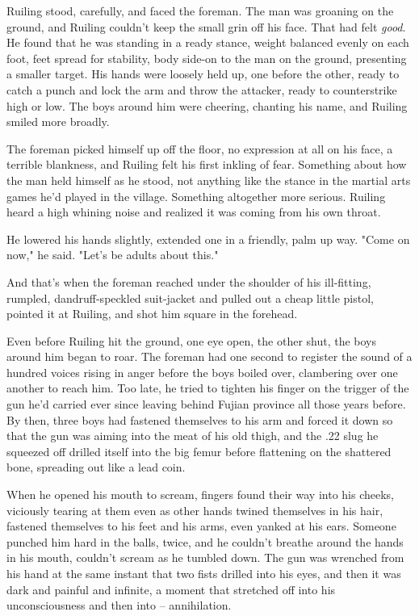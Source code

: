 Ruiling stood, carefully, and faced the foreman. The man was
groaning on the ground, and Ruiling couldn't keep the small grin
off his face. That had felt \emph{good}. He found that he was
standing in a ready stance, weight balanced evenly on each foot,
feet spread for stability, body side-on to the man on the ground,
presenting a smaller target. His hands were loosely held up, one
before the other, ready to catch a punch and lock the arm and throw
the attacker, ready to counterstrike high or low. The boys around
him were cheering, chanting his name, and Ruiling smiled more
broadly.

The foreman picked himself up off the floor, no expression at all
on his face, a terrible blankness, and Ruiling felt his first
inkling of fear. Something about how the man held himself as he
stood, not anything like the stance in the martial arts games he'd
played in the village. Something altogether more serious. Ruiling
heard a high whining noise and realized it was coming from his own
throat.

He lowered his hands slightly, extended one in a friendly, palm up
way. "Come on now," he said. "Let's be adults about this."

And that's when the foreman reached under the shoulder of his
ill-fitting, rumpled, dandruff-speckled suit-jacket and pulled out
a cheap little pistol, pointed it at Ruiling, and shot him square
in the forehead.

Even before Ruiling hit the ground, one eye open, the other shut,
the boys around him began to roar. The foreman had one second to
register the sound of a hundred voices rising in anger before the
boys boiled over, clambering over one another to reach him. Too
late, he tried to tighten his finger on the trigger of the gun he'd
carried ever since leaving behind Fujian province all those years
before. By then, three boys had fastened themselves to his arm and
forced it down so that the gun was aiming into the meat of his old
thigh, and the .22 slug he squeezed off drilled itself into the big
femur before flattening on the shattered bone, spreading out like a
lead coin.

When he opened his mouth to scream, fingers found their way into
his cheeks, viciously tearing at them even as other hands twined
themselves in his hair, fastened themselves to his feet and his
arms, even yanked at his ears. Someone punched him hard in the
balls, twice, and he couldn't breathe around the hands in his
mouth, couldn't scream as he tumbled down. The gun was wrenched
from his hand at the same instant that two fists drilled into his
eyes, and then it was dark and painful and infinite, a moment that
stretched off into his unconsciousness and then into --
annihilation.

